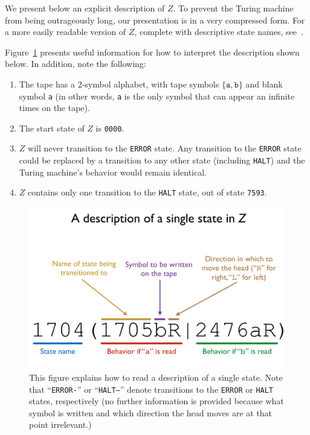 \documentclass[11pt]{article}
\newcommand{\zhaltstate}{\texttt{7593}}
\begin{document}
\begin{appendices}
We present below an explicit description of $Z$. To prevent the Turing machine from being outrageously long, our presentation is in a very compressed form. For a more easily readable version of $Z$, complete with descriptive state names, see~\cite{github}. 

Figure~\ref{fig:syntax} presents useful information for how to interpret the description shown below. In addition, note the following:

\begin{enumerate}

\item The tape has a 2-symbol alphabet, with tape symbols $\{\texttt{a}, \texttt{b}\}$ and blank symbol \texttt{a} (in other words, \texttt{a} is the only symbol that can appear an infinite times on the tape).
\item The start state of $Z$ is \texttt{0000}.
\item $Z$ will never transition to the \texttt{ERROR} state. Any transition to the \texttt{ERROR} state could be replaced by a transition to any other state (including \texttt{HALT}) and the Turing machine's behavior would remain identical.
\item $Z$ contains only one transition to the \texttt{HALT} state, out of state \zhaltstate.

\end{enumerate}

\begin{figure} 
\begin{center} 
\includegraphics[scale=0.4]{figs/syntax.png}
\caption{This figure explains how to read a description of a single state. Note that ``\texttt{ERROR-}'' or ``\texttt{HALT--}'' denote transitions to the \texttt{ERROR} or \texttt{HALT} states, respectively (no further information is provided because what symbol is written and which direction the head moves are at that point irrelevant.) \label{fig:syntax}} 
\end{center} 
\end{figure}

\clearpage


\end{appendices}
\end{document}
